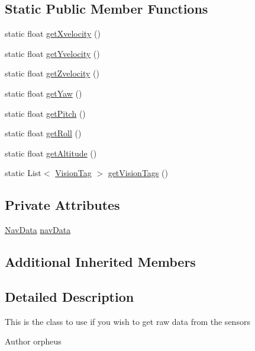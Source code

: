 \subsection*{Static Public Member Functions}
\begin{DoxyCompactItemize}
\item 
static float \hyperlink{class_drone_1_1_hardware_1_1_sensor_manager_ac30ee50b32525bc97ea893a1b1e9db64}{get\+Xvelocity} ()
\item 
static float \hyperlink{class_drone_1_1_hardware_1_1_sensor_manager_aabbda2dbc136a5309cafc9b3040c0fe2}{get\+Yvelocity} ()
\item 
static float \hyperlink{class_drone_1_1_hardware_1_1_sensor_manager_ab0af3ec601df9430e21a11205afa32a9}{get\+Zvelocity} ()
\item 
static float \hyperlink{class_drone_1_1_hardware_1_1_sensor_manager_a2939cc16eb927f24c02aab973ed819e8}{get\+Yaw} ()
\item 
static float \hyperlink{class_drone_1_1_hardware_1_1_sensor_manager_a76911caf24ac333efed7233b1faa23c4}{get\+Pitch} ()
\item 
static float \hyperlink{class_drone_1_1_hardware_1_1_sensor_manager_a754ce2483011b831da946c799b376dcd}{get\+Roll} ()
\item 
static float \hyperlink{class_drone_1_1_hardware_1_1_sensor_manager_a79458552d1dc0b44fa31b548796b06e6}{get\+Altitude} ()
\item 
static List$<$ \hyperlink{classworkspace_1_1_a_r_drone_nav_data_1_1src_1_1controller_1_1_vision_tag}{Vision\+Tag} $>$ \hyperlink{class_drone_1_1_hardware_1_1_sensor_manager_af74d99092191f136a279db6fbdc6ec18}{get\+Vision\+Tags} ()
\end{DoxyCompactItemize}
\subsection*{Private Attributes}
\begin{DoxyCompactItemize}
\item 
\hyperlink{classworkspace_1_1_a_r_drone_nav_data_1_1src_1_1_nav_data}{Nav\+Data} \hyperlink{class_drone_1_1_hardware_1_1_sensor_manager_af52c954878df8ae3ffd3984ea9631048}{nav\+Data}
\end{DoxyCompactItemize}
\subsection*{Additional Inherited Members}


\subsection{Detailed Description}
This is the class to use if you wish to get raw data from the sensors \begin{DoxyAuthor}{Author}
orpheus 
\end{DoxyAuthor}


